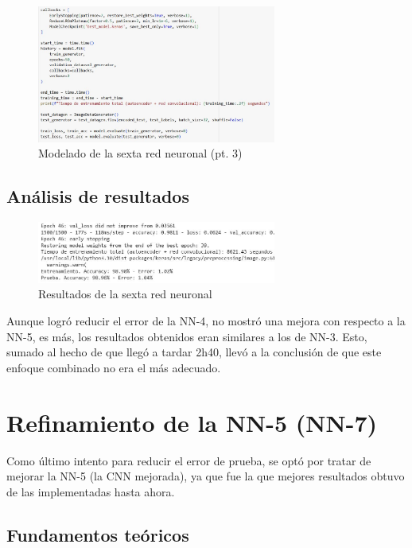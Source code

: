 \begin{enumerate}
	\begin{figure}[H]
		\centering
		\includegraphics[width=0.7\textwidth]{imgs/model-3-red6.JPG}
		\caption{Modelado de la sexta red neuronal (pt. 3)}
		\label{fig:model-3-red6}
	\end{figure}
\end{enumerate}


\subsection{Análisis de resultados}

\begin{figure}[H]
	\centering
	\includegraphics[width=0.7\textwidth]{imgs/results-red6.JPG}
	\caption{Resultados de la sexta red neuronal}
	\label{fig:results-red6}
\end{figure}

Aunque logró reducir el error de la NN-4, no mostró una mejora con respecto a la NN-5, es más, los resultados obtenidos eran similares a los de NN-3. Esto, sumado al hecho de que llegó a tardar 2h40, llevó a la conclusión de que este enfoque combinado no era el más adecuado.

\newpage
\section{Refinamiento de la NN-5 (NN-7)}

Como último intento para reducir el error de prueba, se optó por tratar de mejorar la NN-5 (la CNN mejorada), ya que fue la que mejores resultados obtuvo de las implementadas hasta ahora.

\subsection{Fundamentos teóricos}

